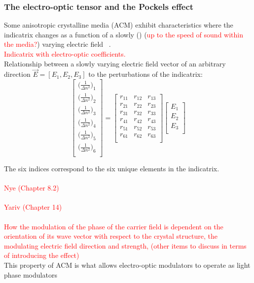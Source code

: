 \subsubsection{The electro-optic tensor and the Pockels effect}
Some anisotropic crystalline media (ACM) exhibit characteristics where the indicatrix changes as a function of a slowly () (\textcolor{red}{up to the speed of sound within the media?}) varying electric field ~\cite{yariv,nye}.
\\
\textcolor{red}{Indicatrix with electro-optic coefficients.}
\\
Relationship between a slowly varying electric field vector of an arbitrary direction $\vec{E} = [E_1, E_2, E_3]$ to the perturbations of the indicatrix:
\\
\begin{equation}
  \left[ {\begin{array}{c}
   \big( \frac{1}{\Delta n ^2 } \big)_1 \\
   \big( \frac{1}{\Delta n ^2 } \big)_2 \\
   \big( \frac{1}{\Delta n ^2 } \big)_3 \\
   \big( \frac{1}{\Delta n ^2 } \big)_4 \\
   \big( \frac{1}{\Delta n ^2 } \big)_5 \\
   \big( \frac{1}{\Delta n ^2 } \big)_6 \\

  \end{array} } \right]
  =
%
 \left[ {\begin{array}{ccc}
   r_{11} & r_{12} & r_{13}\\
   r_{21} & r_{22} & r_{23}\\
   r_{31} & r_{32} & r_{33}\\
   r_{41} & r_{42} & r_{43}\\
   r_{51} & r_{52} & r_{53}\\
   r_{61} & r_{62} & r_{63}\\
  \end{array}} \right]
 \left[{\begin{array}{c}
   E_1\\
   E_2\\
   E_3\\
 \end{array}} \right]
\end{equation}

The six indices correspond to the six unique elements in the indicatrix.
\\
\\
\textcolor{red}{Nye (Chapter 8.2)}
\\
\\
\textcolor{red}{Yariv (Chapter 14)}
\\
\\
\textcolor{red}{ How the modulation of the phase of the carrier field is dependent on the orientation of its wave vector with respect to the crystal structure, the modulating electric field direction and strength, (other items to discuss in terms of introducing the effect)}
\\
This property of ACM is what allows electro-optic modulators to operate as light phase modulators


